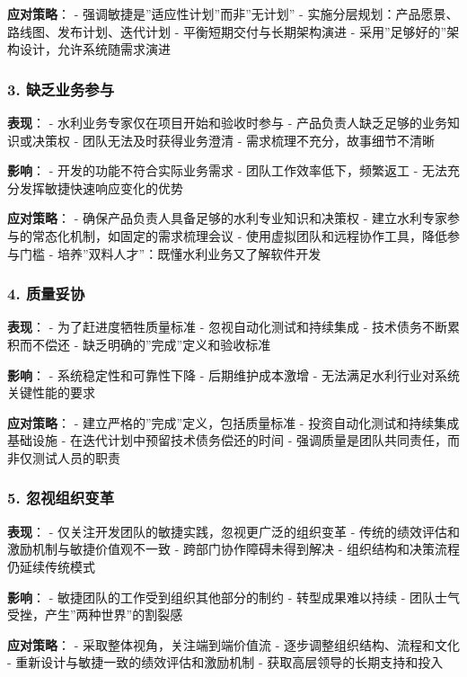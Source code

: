 \textbf{应对策略}： - 强调敏捷是''适应性计划''而非''无计划'' -
实施分层规划：产品愿景、路线图、发布计划、迭代计划 -
平衡短期交付与长期架构演进 -
采用''足够好的''架构设计，允许系统随需求演进

\subsubsection{3.
缺乏业务参与}\label{ux7f3aux4e4fux4e1aux52a1ux53c2ux4e0e}

\textbf{表现}： - 水利业务专家仅在项目开始和验收时参与 -
产品负责人缺乏足够的业务知识或决策权 - 团队无法及时获得业务澄清 -
需求梳理不充分，故事细节不清晰

\textbf{影响}： - 开发的功能不符合实际业务需求 -
团队工作效率低下，频繁返工 - 无法充分发挥敏捷快速响应变化的优势

\textbf{应对策略}： - 确保产品负责人具备足够的水利专业知识和决策权 -
建立水利专家参与的常态化机制，如固定的需求梳理会议 -
使用虚拟团队和远程协作工具，降低参与门槛 -
培养''双料人才''：既懂水利业务又了解软件开发

\subsubsection{4. 质量妥协}\label{ux8d28ux91cfux59a5ux534f}

\textbf{表现}： - 为了赶进度牺牲质量标准 - 忽视自动化测试和持续集成 -
技术债务不断累积而不偿还 - 缺乏明确的''完成''定义和验收标准

\textbf{影响}： - 系统稳定性和可靠性下降 - 后期维护成本激增 -
无法满足水利行业对系统关键性能的要求

\textbf{应对策略}： - 建立严格的''完成''定义，包括质量标准 -
投资自动化测试和持续集成基础设施 - 在迭代计划中预留技术债务偿还的时间 -
强调质量是团队共同责任，而非仅测试人员的职责

\subsubsection{5.
忽视组织变革}\label{ux5ffdux89c6ux7ec4ux7ec7ux53d8ux9769}

\textbf{表现}： - 仅关注开发团队的敏捷实践，忽视更广泛的组织变革 -
传统的绩效评估和激励机制与敏捷价值观不一致 - 跨部门协作障碍未得到解决 -
组织结构和决策流程仍延续传统模式

\textbf{影响}： - 敏捷团队的工作受到组织其他部分的制约 -
转型成果难以持续 - 团队士气受挫，产生''两种世界''的割裂感

\textbf{应对策略}： - 采取整体视角，关注端到端价值流 -
逐步调整组织结构、流程和文化 - 重新设计与敏捷一致的绩效评估和激励机制 -
获取高层领导的长期支持和投入

